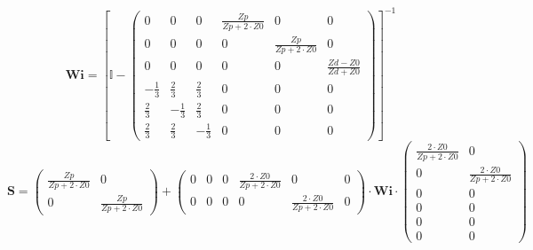 \[ \mathbf{Wi} =  \left[ \mathbb{I}  - \left(\begin{array}{cccccc} 0 &
0 & 0 & \frac{Zp}{Zp+2\cdot Z0} & 0 & 0 \\ 0 & 0 & 0 & 0 &
\frac{Zp}{Zp+2\cdot Z0} & 0 \\ 0 & 0 & 0 & 0 & 0 & \frac{ Zd -Z0}{ Zd
+Z0} \\ -\frac{1}{3} & \frac{2}{3} & \frac{2}{3} & 0 & 0 & 0 \\
\frac{2}{3} & -\frac{1}{3} & \frac{2}{3} & 0 & 0 & 0 \\ \frac{2}{3} &
\frac{2}{3} & -\frac{1}{3} & 0 & 0 & 0 \end{array}\right) \right]^{-1}
\]
\[ \mathbf{S} = \left(\begin{array}{cc} \frac{Zp}{Zp+2\cdot Z0} & 0 \\
0 & \frac{Zp}{Zp+2\cdot Z0} \end{array}\right) +
\left(\begin{array}{cccccc} 0 & 0 & 0 & \frac{2\cdot Z0}{Zp+2\cdot Z0}
& 0 & 0 \\ 0 & 0 & 0 & 0 & \frac{2\cdot Z0}{Zp+2\cdot Z0} & 0
\end{array}\right) \cdot \mathbf{Wi} \cdot\left(\begin{array}{cc}
\frac{2\cdot Z0}{Zp+2\cdot Z0} & 0 \\ 0 & \frac{2\cdot Z0}{Zp+2\cdot
Z0} \\ 0 & 0 \\ 0 & 0 \\ 0 & 0 \\ 0 & 0 \end{array}\right) \]
